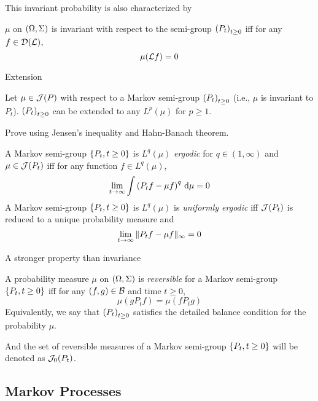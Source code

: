 \documentclass{article}
\begin{document}
This invariant probability is also characterized by

\begin{proposition}
    \(\mu\) on \(\left( \Omega,\Sigma \right)\) is invariant with respect to the semi-group \(\left( P_t \right)_{t\geq 0}\) iff for any \(f\in \mathcal{D}(\mathcal{L})\), 
    \begin{equation}
        \mu(\mathcal{L} f)=0
    \end{equation}
\end{proposition}

Extension

\begin{proposition}
    Let \(\mu \in \mathcal{J}(P)\) with respect to a Markov semi-group \(\left( P_t \right)_{t\geq 0}\) (i.e., \(\mu\) is invariant to \(P_t\)). \(\left( P_t \right)_{t\geq 0}\)  can be extended to any \(L^p(\mu)\) for \(p\geq 1\).
\end{proposition}

Prove using Jensen's inequality and Hahn-Banach theorem.

\begin{definition}
    A Markov semi-group \(\left\{ P_t,t\geq 0 \right\}\) is \(L^q(\mu)\) \emph{ergodic} for \(q\in (1,\infty)\) and \(\mu\in \mathcal{J}(P_t)\) iff for any function \(f\in L^q(\mu)\),
    \[
        \lim_{t\to\infty}\int \left( P_t f-\mu f \right)^q \,\mathrm{d} \mu = 0
    \]
    A Markov semi-group \(\left\{ P_t,t\geq 0 \right\}\) is \(L^q(\mu)\) is \emph{uniformly ergodic} iff \(\mathcal{J}(P_t)\) is reduced to a unique probability measure and
    \[
        \lim_{t\to\infty}\| P_t f-\mu f \|_{\infty}=0
    \]
\end{definition}


A stronger property than invariance
\begin{definition}
    A probability measure \(\mu\) on \(\left( \Omega,\Sigma \right)\) is \emph{reversible} for a Markov semi-group \(\left\{ P_t,t\geq 0 \right\}\) iff for any \(\left( f,g \right)\in\mathcal{B}\) and time \(t\geq 0\), 
    \begin{equation}
        \mu(g P_t f)=\mu(fP_t g)
    \end{equation}
    Equivalently, we say that \(\left( P_t \right)_{t\geq0}\) satisfies the detailed balance condition for the probability \(\mu\).
\end{definition}

And the set of reversible measures of a Markov semi-group \(\left\{ P_t,t\geq 0 \right\}\) will be denoted as \(\mathcal{J}_0(P_t)\).

\subsection{Markov Processes}
\end{document}
